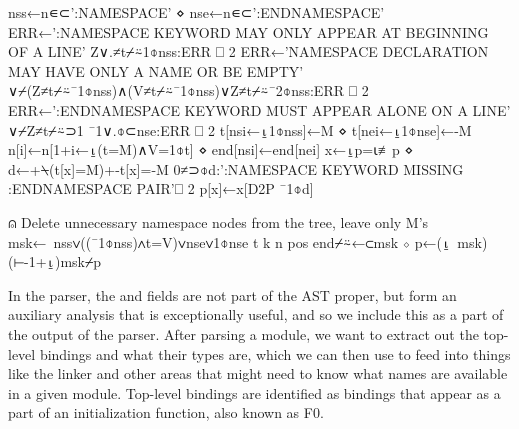 \documentclass{article}%
\begin{document}
\nwenddocs{}\endmoddef\nwstartdeflinemarkup{}\nwenddeflinemarkup
nss←n∊⊂':NAMESPACE' ⋄ nse←n∊⊂':ENDNAMESPACE'
ERR←':NAMESPACE KEYWORD MAY ONLY APPEAR AT BEGINNING OF A LINE'
Z∨.≠t⌿⍨1⌽nss:ERR ⎕ 2
ERR←'NAMESPACE DECLARATION MAY HAVE ONLY A NAME OR BE EMPTY'
∨⌿(Z≠t⌿⍨¯1⌽nss)∧(V≠t⌿⍨¯1⌽nss)∨Z≠t⌿⍨¯2⌽nss:ERR ⎕ 2
ERR←':ENDNAMESPACE KEYWORD MUST APPEAR ALONE ON A LINE'
∨⌿Z≠t⌿⍨⊃1 ¯1∨.⌽⊂nse:ERR ⎕ 2
t[nsi←⍸1⌽nss]←M ⋄ t[nei←⍸1⌽nse]←-M
n[i]←n[1+i←⍸(t=M)∧V=1⌽t] ⋄ end[nsi]←end[nei]
x←⍸p=⍳≢p ⋄ d←+⍀(t[x]=M)+-t[x]=-M
0≠⊃⌽d:':NAMESPACE KEYWORD MISSING :ENDNAMESPACE PAIR'⎕ 2
p[x]←x[D2P ¯1⌽d]

⍝ Delete unnecessary namespace nodes from the tree, leave only M's
msk←~nss∨((¯1⌽nss)∧t=V)∨nse∨1⌽nse
t k n pos end⌿⍨←⊂msk ⋄ p←(⍸~msk)(⊢-1+⍸)msk⌿p
\nwendcode{}\nwdocspar

In the parser,
the {\Tt{}\nwendquote} and {\Tt{}\nwendquote} fields are not part of the AST proper, 
but form an auxiliary analysis that is exceptionally useful,
and so we include this as a part of the output of the parser.
After parsing a module, we want to extract out the top-level 
bindings and what their types are,
which we can then use to feed into things like the linker 
and other areas that might need to know what names are available
in a given module.
Top-level bindings are identified as bindings that appear as a 
part of an initialization function, also known as {\Tt{}F0\nwendquote}.
\end{document}
